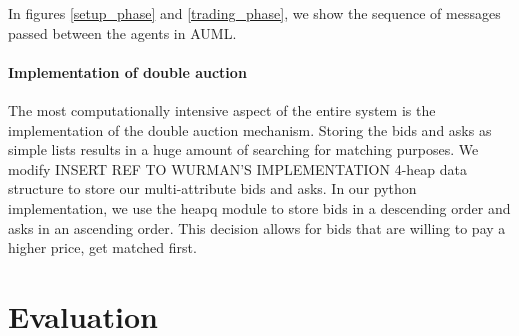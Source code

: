 \documentclass[10pt,journal,compsoc]{IEEEtran}
\begin{document}
In figures \ref{setup_phase} and \ref{trading_phase}, we show the sequence of messages passed between the agents in AUML. 

\paragraph{Implementation of double auction}
The most computationally intensive aspect of the entire system is the implementation of the double auction mechanism. Storing the bids and asks as simple lists results in a huge amount of searching for matching purposes. We modify {INSERT REF TO WURMAN'S IMPLEMENTATION} 4-heap data structure to store our multi-attribute bids and asks. In our python implementation, we use the heapq module to store bids in a descending order and asks in an ascending order. This decision allows for bids that are willing to pay a higher price, get matched first. 

\section{Evaluation}
\end{document}
